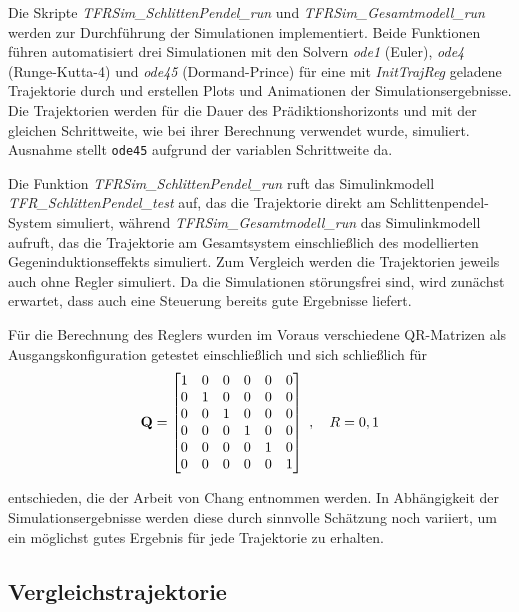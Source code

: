 Die Skripte \textit{TFRSim\_SchlittenPendel\_run} und \textit{TFRSim\_Gesamtmodell\_run} werden zur Durchführung der Simulationen implementiert. Beide Funktionen führen automatisiert drei Simulationen mit den Solvern \textit{ode1} (Euler), \textit{ode4} (Runge-Kutta-4) und \textit{ode45} (Dormand-Prince) für eine mit \textit{InitTrajReg} geladene Trajektorie durch und erstellen Plots und Animationen der Simulationsergebnisse. Die Trajektorien werden für die Dauer des Prädiktionshorizonts und mit der gleichen Schrittweite, wie bei ihrer Berechnung verwendet wurde, simuliert. Ausnahme stellt \texttt{ode45} aufgrund der variablen Schrittweite da.

Die Funktion \textit{TFRSim\_SchlittenPendel\_run} ruft das Simulinkmodell \textit{TFR\_SchlittenPendel\_test} auf, das die Trajektorie direkt am Schlittenpendel-System simuliert, während \textit{TFRSim\_Gesamtmodell\_run} das Simulinkmodell  aufruft, das die Trajektorie am Gesamtsystem einschließlich des modellierten Gegeninduktionseffekts simuliert. Zum Vergleich werden die Trajektorien jeweils auch ohne Regler simuliert. Da die Simulationen störungsfrei sind, wird zunächst erwartet, dass auch eine Steuerung bereits gute Ergebnisse liefert.

Für die Berechnung des Reglers wurden im Voraus verschiedene QR-Matrizen als Ausgangskonfiguration getestet einschließlich und sich schließlich für 
\[ 
	{\boldsymbol{\mathrm{Q}}} = 
	\begin{bmatrix}
		1 & 0 & 0 & 0 & 0 & 0 \\
		0 & 1 & 0 & 0 & 0 & 0 \\
		0 & 0 & 1 & 0 & 0 & 0 \\
		0 & 0 & 0 & 1 & 0 & 0 \\
		0 & 0 & 0 & 0 & 1 & 0 \\
		0 & 0 & 0 & 0 & 0 & 1 \\
	\end{bmatrix} \ , \quad
	R = 0,1 \\
\]

entschieden, die der Arbeit von Chang \cite{chang} entnommen werden. In Abhängigkeit der Simulationsergebnisse werden diese durch sinnvolle Schätzung noch variiert, um ein möglichst gutes Ergebnis für jede Trajektorie zu erhalten.    

\subsection{Vergleichstrajektorie}\label{subsec:vglTrj}

